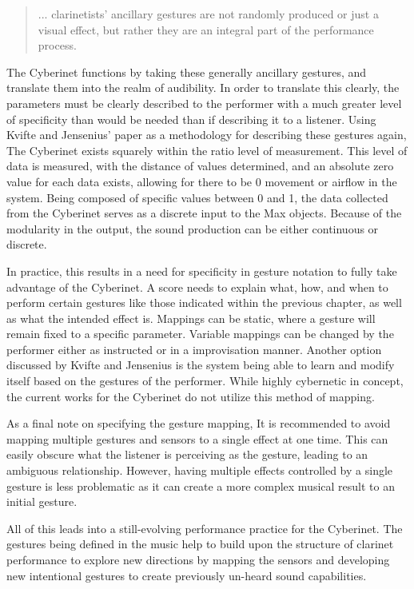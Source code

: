 \begin{quote}
    ... clarinetists' ancillary gestures are not randomly produced or just a visual effect, but rather they are an integral part of the performance process\cite{wanderleyClarinetGesture2005}.
\end{quote}

The Cyberinet functions by taking these generally ancillary gestures, and translate them into the realm of audibility. In order to translate this clearly, the parameters must be clearly described to the performer with a much greater level of specificity than would be needed than if describing it to a listener\cite{KvifteJenseniusDescription}. Using Kvifte and Jensenius' paper as a methodology for describing these gestures again, The Cyberinet exists squarely within the ratio level of measurement. This level of data is measured, with the distance of values determined, and an absolute zero value for each data exists, allowing for there to be 0 movement or airflow in the system. Being composed of specific values between 0 and 1, the data collected from the Cyberinet serves as a discrete input to the Max objects. Because of the modularity in the output, the sound production can be either continuous or discrete.

In practice, this results in a need for specificity in gesture notation to fully take advantage of the Cyberinet. A score needs to explain what, how, and when to perform certain gestures like those indicated within the previous chapter, as well as what the intended effect is. Mappings can be static, where a gesture will remain fixed to a specific parameter. Variable mappings can be changed by the performer either as instructed or in a improvisation manner. Another option discussed by Kvifte and Jensenius is the system being able to learn and modify itself based on the gestures of the performer\cite{KvifteJenseniusDescription}. While highly cybernetic in concept, the current works for the Cyberinet do not utilize this method of mapping.

As a final note on specifying the gesture mapping, It is recommended to avoid mapping multiple gestures and sensors to a single effect at one time. This can easily obscure what the listener is perceiving as the gesture, leading to an ambiguous relationship. However, having multiple effects controlled by a single gesture is less problematic as it can create a more complex musical result to an initial gesture.

All of this leads into a still-evolving performance practice for the Cyberinet. The gestures being defined in the music help to build upon the structure of clarinet performance to explore new directions by mapping the sensors and developing new intentional gestures to create previously un-heard sound capabilities.



